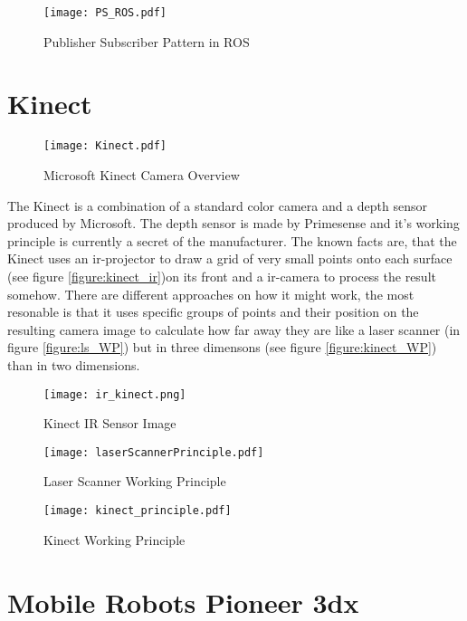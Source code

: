 \begin{figure}[h]
	\centering
	\texttt{[image: PS\_ROS.pdf]}
	\caption{Publisher Subscriber Pattern in ROS}
	\label{figure:psp_ROS}
\end{figure} 


 
\clearpage


\section{Kinect}

\begin{figure}[h]
	\centering
	\texttt{[image: Kinect.pdf]}
	\caption{Microsoft Kinect Camera Overview}
	\label{figure:kinect_ir}
\end{figure}

The Kinect is a combination of a standard color camera and a depth sensor produced by Microsoft. The depth sensor is made by Primesense and 
it's working principle is currently a secret of the manufacturer. The known facts are, that the Kinect uses an ir-projector to draw a 
grid of very small points onto each surface (see figure \vref{figure:kinect_ir})on its front and a ir-camera to process the result somehow.  
There are different approaches on how it might work, the most resonable is that it uses 
specific groups of points and their position on the resulting camera image to calculate how far 
away they are like a laser scanner (in figure \vref{figure:ls_WP}) but in three dimensons (see figure \vref{figure:kinect_WP}) 
than in two dimensions. 

\begin{figure}[h]
	\centering
	\texttt{[image: ir\_kinect.png]}
	\caption{Kinect IR Sensor Image}
	\label{figure:kinect_ir}
\end{figure}

\begin{figure}[h]
	\centering
	\texttt{[image: laserScannerPrinciple.pdf]}
	\caption{Laser Scanner Working Principle}
	\label{figure:ls_WP}
\end{figure}


\begin{figure}[h]
	\centering
	\texttt{[image: kinect\_principle.pdf]}
	\caption{Kinect Working Principle}
	\label{figure:kinect_WP} 
\end{figure}
\clearpage
\section{Mobile Robots Pioneer 3dx}


